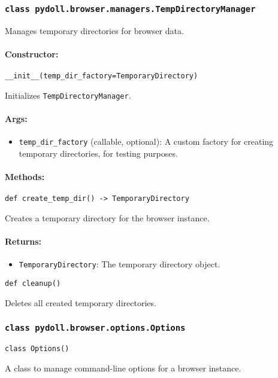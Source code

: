 \documentclass{article}
\begin{document}
\subsubsection*{\texttt{class pydoll.browser.managers.TempDirectoryManager}}
\noindent Manages temporary directories for browser data.

\paragraph{Constructor:}
\noindent\texttt{\_\_init\_\_(temp\_dir\_factory=TemporaryDirectory)}

\noindent Initializes \texttt{TempDirectoryManager}.

\paragraph{Args:}
\begin{itemize}
    \item \texttt{temp\_dir\_factory} (callable, optional): A custom factory for creating temporary directories, for testing purposes.
\end{itemize}

\paragraph{Methods:}
\noindent\texttt{def create\_temp\_dir() -> TemporaryDirectory}

\noindent Creates a temporary directory for the browser instance.

\paragraph{Returns:}
\begin{itemize}
    \item \texttt{TemporaryDirectory}: The temporary directory object.
\end{itemize}

\noindent\texttt{def cleanup()}

\noindent Deletes all created temporary directories.

\subsubsection*{\texttt{class pydoll.browser.options.Options}}
\noindent\texttt{class Options()}

\noindent A class to manage command-line options for a browser instance.
\end{document}
